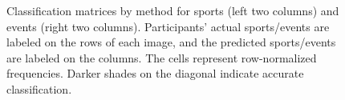 \begin{figure}
\begin{center}
\begin{minipage}{0.20\textwidth}
\begin{center}
    \end{center}
  \end{minipage}

  \end{center}

\caption{Classification matrices by method for sports (left two columns) and events (right two columns). Participants' actual sports/events are labeled on the rows of each image, and the predicted sports/events are labeled on the columns. The cells represent row-normalized frequencies. Darker shades on the diagonal indicate accurate classification.}
\label{matrices}
\end{figure}